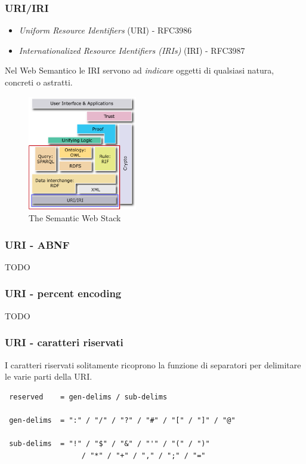 \documentclass[8pt]{beamer}
\begin{document}
\begin{frame}
	\frametitle{URI/IRI}
	
	\begin{itemize}
	  \item \emph{Uniform Resource Identifiers} (URI) - RFC3986
	  \item \emph{Internationalized Resource Identifiers (IRIs)} (IRI) - RFC3987
	\end{itemize}	
	
	Nel Web Semantico le IRI servono ad \emph{indicare} oggetti di qualsiasi
	natura, concreti o astratti.
	
	\begin{figure}
	    \includegraphics[width=180px]{imgs/Semantic_Web_Stack_uri.png}
	    \caption{The Semantic Web Stack} 
	\end{figure}
\end{frame}

\begin{frame}
	\frametitle{URI - ABNF}
	TODO
\end{frame}

\begin{frame}
	\frametitle{URI - percent encoding}
	TODO
\end{frame}

\begin{frame}[fragile]
	\frametitle{URI - caratteri riservati}
	
	I caratteri riservati solitamente ricoprono la funzione di 
	separatori per delimitare le varie parti della URI.
	
	\begin{verbatim}
 reserved    = gen-delims / sub-delims
 
 gen-delims  = ":" / "/" / "?" / "#" / "[" / "]" / "@"

 sub-delims  = "!" / "$" / "&" / "'" / "(" / ")"
                  / "*" / "+" / "," / ";" / "=" 
                  

                  
	\end{verbatim}
	\vspace{\baselineskip}
	

\end{frame}
\end{document}
